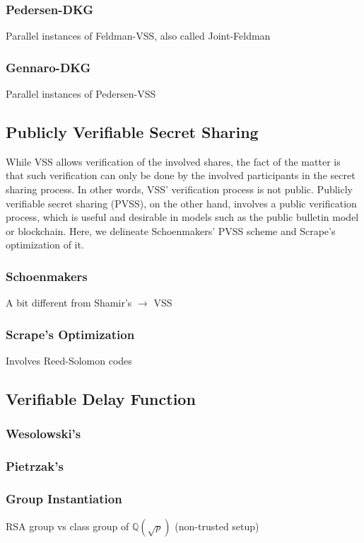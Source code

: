 \documentclass[11pt]{article}
\theoremstyle{definition}
\theoremstyle{remark}
\begin{document}
\subsubsection{Pedersen-DKG}
Parallel instances of Feldman-VSS, also called Joint-Feldman

\subsubsection{Gennaro-DKG}
Parallel instances of Pedersen-VSS


\subsection{Publicly Verifiable Secret Sharing}
While VSS allows verification of the involved shares, the fact of the matter is that such verification can only be done by the involved participants in the secret sharing process. In other words, VSS' verification process is not public. Publicly verifiable secret sharing (PVSS), on the other hand, involves a public verification process, which is useful and desirable in models such as the public bulletin model or blockchain. Here, we delineate Schoenmakers' PVSS scheme and Scrape's optimization of it.

\subsubsection{Schoenmakers}
A bit different from Shamir's $\rightarrow$ VSS

\subsubsection{Scrape's Optimization}
Involves Reed-Solomon codes

\subsection{Verifiable Delay Function}
\subsubsection{Wesolowski's}
\subsubsection{Pietrzak's}
\subsubsection{Group Instantiation}
RSA group vs class group of $\mathbb{Q}(\sqrt{p})$ (non-trusted setup)
\end{document}
